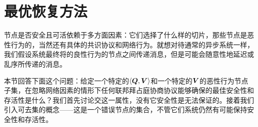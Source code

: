 \section{最优恢复方法}\label{sec:resilience}

节点是否安全且可活依赖于多方面因素：它们选择了什么样的{\quorum}切片，那些节点是恶性行为的，当然还有具体的共识协议和网络行为。就想对待通常的异步系统一样，我们假设系统最终将的良性行为的节点之间传递消息，但是可能会随意性地延迟或乱序所传递的消息。

本节回答下面这个问题：给定一个特定的$\langle{\bm Q},{\bm V}\rangle$和一个特定的${\bm V}$的恶性行为节点子集，在忽略网络因素的情形下任何联邦拜占庭协商协议能够确保的最佳安全性和存活性是什么？我们首先讨论{\quorum}交这一属性，没有它安全性是无法保证的。接着我们引入可去集的概念——这是一个错误节点的集合，不管它们系统仍然有可能保持安全性和存活性。



